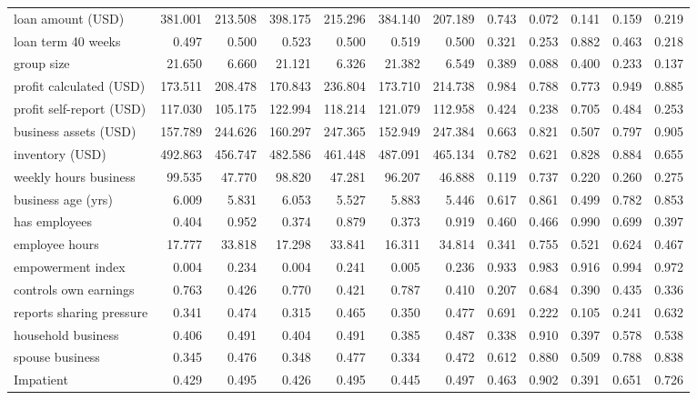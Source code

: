 \begin{tabular}{lrrrrrrrrrrr}
loan amount (USD) & 381.001 & 213.508 & 398.175 & 215.296 & 384.140 & 207.189 & 0.743 & 0.072 & 0.141 & 0.159 & 0.219\\
loan term 40 weeks & 0.497 & 0.500 & 0.523 & 0.500 & 0.519 & 0.500 & 0.321 & 0.253 & 0.882 & 0.463 & 0.218\\
group size & 21.650 & 6.660 & 21.121 & 6.326 & 21.382 & 6.549 & 0.389 & 0.088 & 0.400 & 0.233 & 0.137\\
profit calculated (USD) & 173.511 & 208.478 & 170.843 & 236.804 & 173.710 & 214.738 & 0.984 & 0.788 & 0.773 & 0.949 & 0.885\\
\addlinespace
profit self-report (USD) & 117.030 & 105.175 & 122.994 & 118.214 & 121.079 & 112.958 & 0.424 & 0.238 & 0.705 & 0.484 & 0.253\\
business assets (USD) & 157.789 & 244.626 & 160.297 & 247.365 & 152.949 & 247.384 & 0.663 & 0.821 & 0.507 & 0.797 & 0.905\\
inventory (USD) & 492.863 & 456.747 & 482.586 & 461.448 & 487.091 & 465.134 & 0.782 & 0.621 & 0.828 & 0.884 & 0.655\\
weekly hours business & 99.535 & 47.770 & 98.820 & 47.281 & 96.207 & 46.888 & 0.119 & 0.737 & 0.220 & 0.260 & 0.275\\
business age (yrs) & 6.009 & 5.831 & 6.053 & 5.527 & 5.883 & 5.446 & 0.617 & 0.861 & 0.499 & 0.782 & 0.853\\
\addlinespace
has employees & 0.404 & 0.952 & 0.374 & 0.879 & 0.373 & 0.919 & 0.460 & 0.466 & 0.990 & 0.699 & 0.397\\
employee hours & 17.777 & 33.818 & 17.298 & 33.841 & 16.311 & 34.814 & 0.341 & 0.755 & 0.521 & 0.624 & 0.467\\
empowerment index & 0.004 & 0.234 & 0.004 & 0.241 & 0.005 & 0.236 & 0.933 & 0.983 & 0.916 & 0.994 & 0.972\\
controls own earnings & 0.763 & 0.426 & 0.770 & 0.421 & 0.787 & 0.410 & 0.207 & 0.684 & 0.390 & 0.435 & 0.336\\
reports sharing pressure & 0.341 & 0.474 & 0.315 & 0.465 & 0.350 & 0.477 & 0.691 & 0.222 & 0.105 & 0.241 & 0.632\\
\addlinespace
household business & 0.406 & 0.491 & 0.404 & 0.491 & 0.385 & 0.487 & 0.338 & 0.910 & 0.397 & 0.578 & 0.538\\
spouse business & 0.345 & 0.476 & 0.348 & 0.477 & 0.334 & 0.472 & 0.612 & 0.880 & 0.509 & 0.788 & 0.838\\
Impatient & 0.429 & 0.495 & 0.426 & 0.495 & 0.445 & 0.497 & 0.463 & 0.902 & 0.391 & 0.651 & 0.726\\

\end{tabular}
